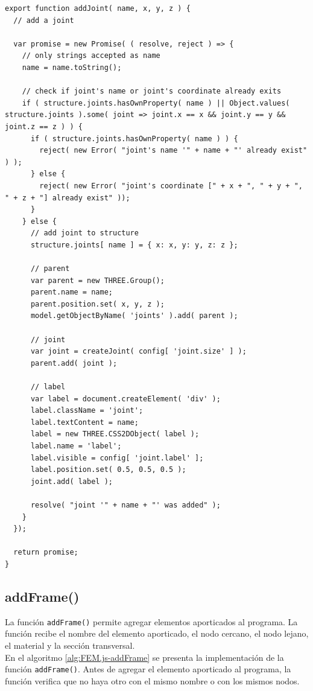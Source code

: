 \begin{lstlisting}[language={},caption=Función \texttt{addJoint()} implementada en el archivo \texttt{FEM.js}.,label=alg:FEM.js-addJoint, frame=single]
export function addJoint( name, x, y, z ) {
  // add a joint

  var promise = new Promise( ( resolve, reject ) => {
    // only strings accepted as name
    name = name.toString();
    
    // check if joint's name or joint's coordinate already exits
    if ( structure.joints.hasOwnProperty( name ) || Object.values( structure.joints ).some( joint => joint.x == x && joint.y == y && joint.z == z ) ) {
      if ( structure.joints.hasOwnProperty( name ) ) {
        reject( new Error( "joint's name '" + name + "' already exist" ) );
      } else {
        reject( new Error( "joint's coordinate [" + x + ", " + y + ", " + z + "] already exist" )); 
      }
    } else {
      // add joint to structure
      structure.joints[ name ] = { x: x, y: y, z: z };

      // parent
      var parent = new THREE.Group();
      parent.name = name;
      parent.position.set( x, y, z );
      model.getObjectByName( 'joints' ).add( parent );
    
      // joint
      var joint = createJoint( config[ 'joint.size' ] );
      parent.add( joint );
  
      // label
      var label = document.createElement( 'div' );
      label.className = 'joint';
      label.textContent = name;
      label = new THREE.CSS2DObject( label );
      label.name = 'label';
      label.visible = config[ 'joint.label' ];
      label.position.set( 0.5, 0.5, 0.5 );
      joint.add( label );

      resolve( "joint '" + name + "' was added" );
    }
  });

  return promise;
}
\end{lstlisting}

\subsection{addFrame()}

La función \verb|addFrame()| permite agregar elementos aporticados al programa. La función recibe el nombre del elemento aporticado, el nodo cercano, el nodo lejano, el material y la sección transversal.\\

En el algoritmo \ref{alg:FEM.js-addFrame} se presenta la implementación de la función \verb|addFrame()|. Antes de agregar el elemento aporticado al programa, la función verifica que no haya otro con el mismo nombre o con los mismos nodos.\\

